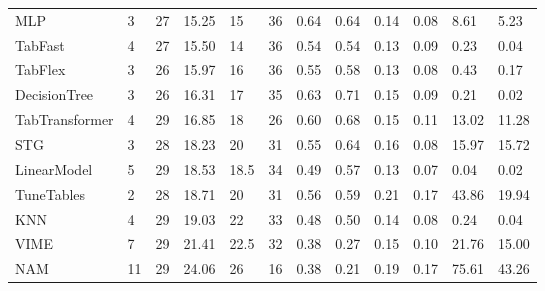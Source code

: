 \begin{tabular}{lllllrllllll}
MLP & 3 & 27 & 15.25 & 15 & 36 & 0.64 & 0.64 & 0.14 & 0.08 & 8.61 & 5.23 \\
TabFast & 4 & 27 & 15.50 & 14 & 36 & 0.54 & 0.54 & 0.13 & 0.09 & 0.23 & 0.04 \\
TabFlex & 3 & 26 & 15.97 & 16 & 36 & 0.55 & 0.58 & 0.13 & 0.08 & 0.43 & 0.17 \\
DecisionTree & 3 & 26 & 16.31 & 17 & 35 & 0.63 & 0.71 & 0.15 & 0.09 & 0.21 & 0.02 \\
TabTransformer & 4 & 29 & 16.85 & 18 & 26 & 0.60 & 0.68 & 0.15 & 0.11 & 13.02 & 11.28 \\
STG & 3 & 28 & 18.23 & 20 & 31 & 0.55 & 0.64 & 0.16 & 0.08 & 15.97 & 15.72 \\
LinearModel & 5 & 29 & 18.53 & 18.5 & 34 & 0.49 & 0.57 & 0.13 & 0.07 & 0.04 & 0.02 \\
TuneTables & 2 & 28 & 18.71 & 20 & 31 & 0.56 & 0.59 & 0.21 & 0.17 & 43.86 & 19.94 \\
KNN & 4 & 29 & 19.03 & 22 & 33 & 0.48 & 0.50 & 0.14 & 0.08 & 0.24 & 0.04 \\
VIME & 7 & 29 & 21.41 & 22.5 & 32 & 0.38 & 0.27 & 0.15 & 0.10 & 21.76 & 15.00 \\
NAM & 11 & 29 & 24.06 & 26 & 16 & 0.38 & 0.21 & 0.19 & 0.17 & 75.61 & 43.26 \\
\bottomrule
\end{tabular}
